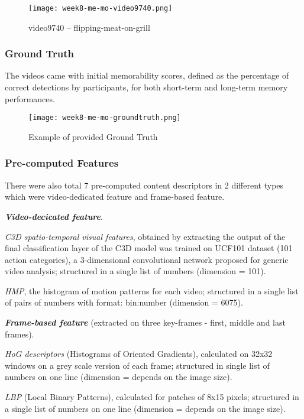 {\begin{figure}[!ht]
\centering
\texttt{[image: week8-me-mo-video9740.png]}
\caption{video9740 -- flipping-meat-on-grill}
\end{figure}

\subsubsection{Ground Truth}
The videos came with initial memorability scores, defined as the percentage of correct detections by participants, for both short-term and long-term memory performances.

\begin{figure}[!ht]
\centering
\texttt{[image: week8-me-mo-groundtruth.png]}
\caption{Example of provided Ground Truth}
\end{figure}

\subsubsection{Pre-computed Features}
There were also total 7 pre-computed content descriptors in 2 different types which were video-dedicated feature and frame-based feature.

\textbf{\emph{Video-decicated feature}}.

\emph{C3D spatio-temporal visual features}\cite{c3d}, obtained by extracting the output of the final classification layer of the C3D model was trained on UCF101 dataset\cite{ucf101} (101 action categories), a 3-dimensional convolutional network proposed for generic video analysis; structured in a single list of numbers (dimension = 101).

\emph{HMP}\cite{hmp}, the histogram of motion patterns for each video; structured in a single list of pairs of numbers with format: bin:number (dimension = 6075).

\textbf{\emph{Frame-based feature}} (extracted on three key-frames - first, middle and last frames).

\emph{HoG descriptors} (Histograms of Oriented Gradients)\cite{hog}, calculated on 32x32 windows on a grey scale version of each frame; structured in single list of numbers on one line (dimension = depends on the image size).

\emph{LBP} (Local Binary Patterns)\cite{lbp}, calculated for patches of 8x15 pixels; structured in a single list of numbers on one line (dimension = depends on the image size).

}
